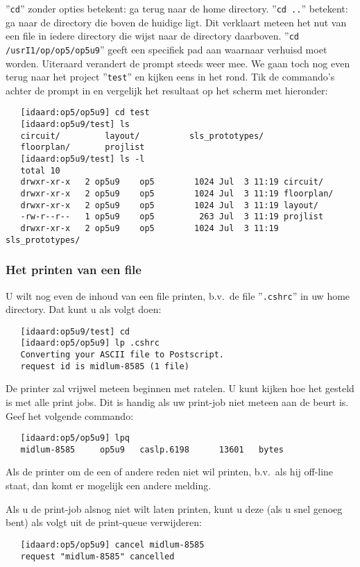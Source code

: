 ''{\tt cd}'' zonder opties betekent: ga terug naar de home directory.
''{\tt cd ..}'' betekent: ga naar de directory die boven de huidige ligt.
Dit verklaart
meteen het nut van een file in iedere directory die wijst naar de directory
daarboven.
''{\tt cd /usrI1/op/op5/op5u9}'' geeft een specifiek pad aan waarnaar
verhuisd moet worden.
Uiteraard verandert de prompt steeds weer mee.
We gaan toch nog even terug naar het project ''{\tt test}''
en kijken eens in het rond.
Tik de commando's achter de prompt in en vergelijk het resultaat op het scherm met hieronder:
\begin{verbatim}
   [idaard:op5/op5u9] cd test
   [idaard:op5u9/test] ls
   circuit/         layout/          sls_prototypes/
   floorplan/       projlist
   [idaard:op5u9/test] ls -l
   total 10
   drwxr-xr-x   2 op5u9    op5        1024 Jul  3 11:19 circuit/
   drwxr-xr-x   2 op5u9    op5        1024 Jul  3 11:19 floorplan/
   drwxr-xr-x   2 op5u9    op5        1024 Jul  3 11:19 layout/
   -rw-r--r--   1 op5u9    op5         263 Jul  3 11:19 projlist
   drwxr-xr-x   2 op5u9    op5        1024 Jul  3 11:19 sls_prototypes/
\end{verbatim}

\subsubsection{Het printen van een file}
\label{Het printen van een file}
U wilt nog even de inhoud van een file printen,
b.v.\ de file ''{\tt .cshrc}'' in uw home directory.
Dat kunt u als volgt doen:
\begin{verbatim}
   [idaard:op5u9/test] cd
   [idaard:op5/op5u9] lp .cshrc
   Converting your ASCII file to Postscript.
   request id is midlum-8585 (1 file)
\end{verbatim}

De printer zal vrijwel meteen beginnen met ratelen.
U kunt kijken hoe het gesteld is met alle print jobs.
Dit is handig als uw print-job niet meteen aan de beurt is.
Geef het volgende commando:
\begin{verbatim}
   [idaard:op5/op5u9] lpq
   midlum-8585     op5u9   caslp.6198      13601   bytes
\end{verbatim}

Als de printer om de een of andere reden niet wil printen,
b.v.\ als hij off-line staat,
dan komt er mogelijk een andere melding.

Als u de print-job alsnog niet wilt laten printen,
kunt u deze (als u snel genoeg bent)
als volgt uit de print-queue verwijderen:
\begin{verbatim}
   [idaard:op5/op5u9] cancel midlum-8585
   request "midlum-8585" cancelled
\end{verbatim}

